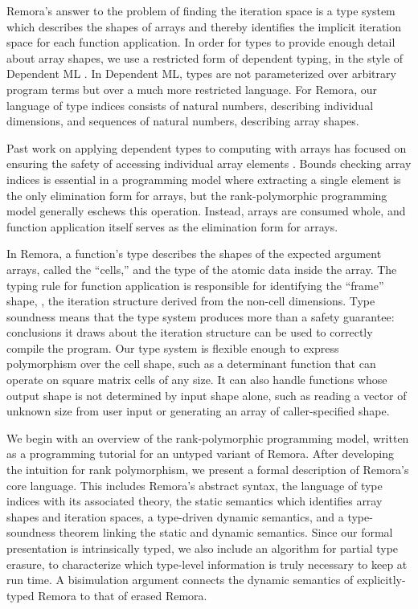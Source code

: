 Remora's answer to the problem of finding the iteration space
is a type system which describes the shapes of arrays
and thereby identifies the implicit iteration space for each function application.
In order for types to provide enough detail about array shapes,
we use a restricted form of dependent typing,
in the style of Dependent ML \cite{DependentML}.
In Dependent ML, types are not parameterized over arbitrary program terms
but over a much more restricted language.
For Remora, our language of type indices
consists of natural numbers, describing individual dimensions,
and sequences of natural numbers, describing array shapes.

Past work on applying dependent types to computing with arrays
has focused on ensuring the safety of accessing individual array elements
\cite{DMLBounds, Qube}.
Bounds checking array indices is essential
in a programming model where extracting a single element
is the only elimination form for arrays,
but the rank-polymorphic programming model generally eschews this operation.
Instead, arrays are consumed whole,
and function application itself serves as the elimination form for arrays.

In Remora, a function's type describes the shapes of the expected argument arrays,
called the ``cells,''
and the type of the atomic data inside the array.
The typing rule for function application
is responsible for identifying the ``frame'' shape,
\ie, the iteration structure derived from the non-cell dimensions.
Type soundness means that
the type system produces more than a safety guarantee:
conclusions it draws about the iteration structure
can be used to correctly compile the program.
Our type system is flexible enough to express polymorphism over the cell shape,
such as a determinant function that can operate on square matrix cells of any size.
It can also handle functions whose output shape is not determined by input shape alone,
such as reading a vector of unknown size from user input
or generating an array of caller-specified shape.


We begin with an overview of the rank-polymorphic programming model,
written as a programming tutorial for an untyped variant of Remora.
After developing the intuition for rank polymorphism,
we present a formal description of Remora's core language.
This includes Remora's abstract syntax,
the language of type indices with its associated theory,
the static semantics which identifies array shapes and iteration spaces,
a type-driven dynamic semantics,
and a type-soundness theorem linking the static and dynamic semantics.
Since our formal presentation is intrinsically typed,
we also include an algorithm for partial type erasure,
to characterize which type-level information is truly necessary to keep at run time.
A bisimulation argument connects
the dynamic semantics of explicitly-typed Remora to that of erased Remora.

